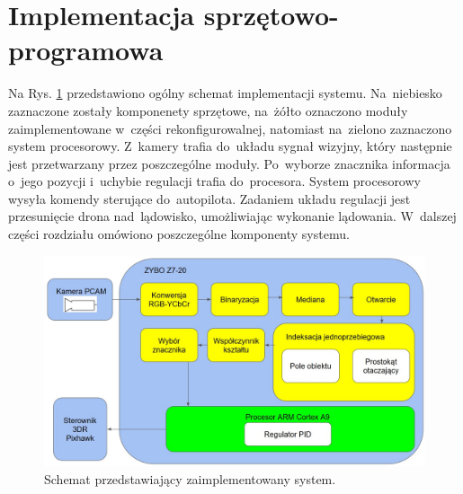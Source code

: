 \section{Implementacja sprzętowo-programowa}
\label{sec:implementacja_sprzetowo_programowa}
Na Rys. \ref{fig:system} przedstawiono ogólny schemat implementacji systemu. Na~niebiesko zaznaczone zostały komponenety sprzętowe, na~żółto oznaczono moduły zaimplementowane w~części rekonfigurowalnej, natomiast na~zielono zaznaczono system procesorowy. Z~kamery trafia do~układu sygnał wizyjny, który następnie jest przetwarzany przez poszczególne moduły. Po~wyborze znacznika informacja o~jego pozycji i~uchybie regulacji trafia do~procesora. System procesorowy wysyła komendy sterujące do~autopilota. Zadaniem układu regulacji jest przesunięcie drona nad~lądowisko, umożliwiając wykonanie lądowania.
W~dalszej części rozdziału omówiono poszczególne komponenty systemu.   
\begin{figure}[h]
	\centering
	\includegraphics[width=\textwidth]{system.jpg}
	\caption{Schemat przedstawiający zaimplementowany system.}
	\label{fig:system}
\end{figure}  
